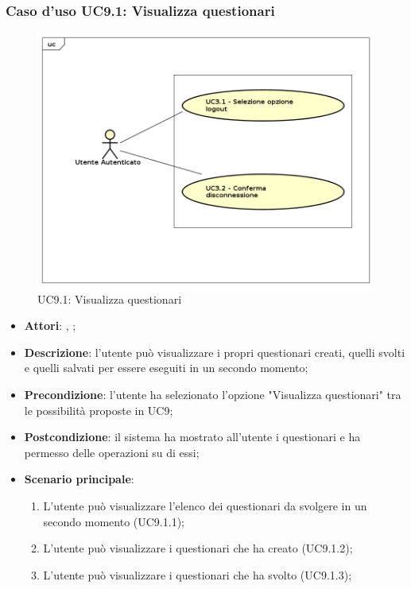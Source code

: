 	\subsubsection{Caso d'uso UC9.1: Visualizza questionari}
	\label{UC9.1}
	\begin{figure}[h]
		\centering
	\includegraphics[scale=0.7,keepaspectratio]{UML/UC9.png}
		\caption{UC9.1: Visualizza questionari}
	\end{figure}
	\FloatBarrier
	\begin{itemize}
		\item \textbf{Attori}: \uau, \uaupro;
		\item \textbf{Descrizione}: l'utente può visualizzare i propri questionari creati, quelli svolti e quelli salvati per essere eseguiti in un secondo momento; 
		\item \textbf{Precondizione}: l'utente ha selezionato l'opzione "Visualizza questionari" tra le possibilità proposte in UC9;
		\item \textbf{Postcondizione}: il sistema ha mostrato all'utente i questionari e ha permesso delle operazioni su di essi; 
		\item \textbf{Scenario principale}: 
			\begin{enumerate}
				\item L'utente può visualizzare l'elenco dei questionari da svolgere in un secondo momento (UC9.1.1);
				\item L'utente può visualizzare i questionari che ha creato (UC9.1.2); 
				\item L'utente può visualizzare i questionari che ha svolto (UC9.1.3); 
			\end{enumerate}
	\end{itemize}
	
